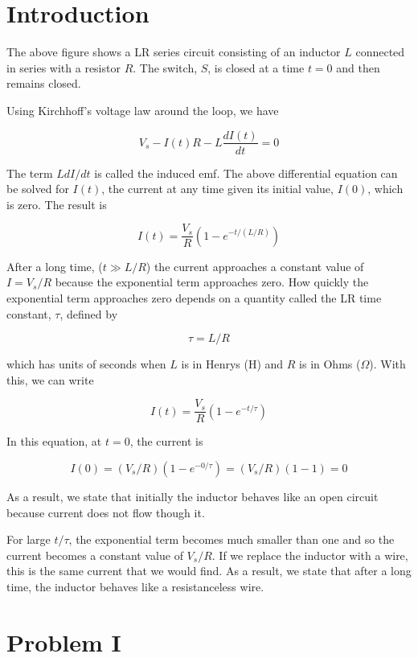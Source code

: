 \documentclass{article}
\begin{document}
\section{Introduction}



The above figure shows a LR series circuit consisting of an inductor $L$ connected in series with a resistor $R$. The switch, $S$, is closed at a time $t = 0$ and then remains closed. 

Using Kirchhoff's voltage law around the loop, we have

$$
V_s - I(t)R - L \frac{dI(t)}{dt} = 0
$$

The term $L dI/dt$ is called the induced emf. The above differential equation can be solved for $I(t)$, the current at any time given its initial value, $I(0)$, which is zero. The result is

$$
I(t)=\frac{V_s}{R}\left(1-e^{-t/(L/R)}\right)
$$

After a long time, ($t\gg L/R$) the current approaches a constant value of $I = V_s/R$ because the exponential term approaches zero. How quickly the exponential term approaches zero depends on a quantity called the LR time constant, $\tau$, defined by

$$\tau = L/R$$

which has units of seconds when $L$ is in Henrys ($\text{H}$) and $R$ is in Ohms ($\Omega$). With this, we can write

$$
I(t) = \frac{V_s}{R}\left(1-e^{-t/\tau}\right)
$$

In this equation, at $t=0$, the current is

$$
I(0) = (V_s/R)\left(1-e^{-0/\tau}\right)=(V_s/R)\left(1-1\right)=0
$$

As a result, we state that initially the inductor behaves like an open circuit because current does not flow though it.

For large $t/\tau$, the exponential term becomes much smaller than one and so the current becomes a constant value of $V_s/R$. If we replace the inductor with a wire, this is the same current that we would find. As a result, we state that after a long time, the inductor behaves like a resistanceless wire.

\ifsolutions

\else

\newpage
\fi

\section{Problem I}
\end{document}
